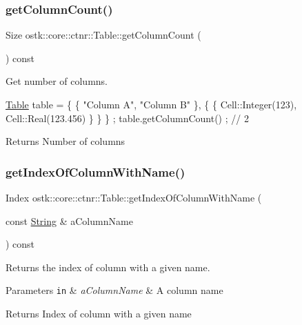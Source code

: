 \subsubsection{\texorpdfstring{get\+Column\+Count()}{getColumnCount()}}
{\footnotesize\ttfamily Size ostk\+::core\+::ctnr\+::\+Table\+::get\+Column\+Count (\begin{DoxyParamCaption}{ }\end{DoxyParamCaption}) const}



Get number of columns. 


\begin{DoxyCode}
\hyperlink{classostk_1_1core_1_1ctnr_1_1_table_a1b799fa804faf23f9dd4905df90a5cd7}{Table} table = \{ \{ \textcolor{stringliteral}{"Column A"}, \textcolor{stringliteral}{"Column B"} \}, \{ \{ Cell::Integer(123), Cell::Real(123.456) \} \} \} ;
table.getColumnCount() ; \textcolor{comment}{// 2}
\end{DoxyCode}


\begin{DoxyReturn}{Returns}
Number of columns 
\end{DoxyReturn}
\mbox{\label{classostk_1_1core_1_1ctnr_1_1_table_aa778da3685c788f96eeddc7eb870581a}} 
\subsubsection{\texorpdfstring{get\+Index\+Of\+Column\+With\+Name()}{getIndexOfColumnWithName()}}
{\footnotesize\ttfamily Index ostk\+::core\+::ctnr\+::\+Table\+::get\+Index\+Of\+Column\+With\+Name (\begin{DoxyParamCaption}\item[{const \hyperlink{classostk_1_1core_1_1types_1_1_string}{String} \&}]{a\+Column\+Name }\end{DoxyParamCaption}) const}



Returns the index of column with a given name. 


\begin{DoxyParams}[1]{Parameters}
\mbox{\tt in}  & {\em a\+Column\+Name} & A column name \\
\hline
\end{DoxyParams}
\begin{DoxyReturn}{Returns}
Index of column with a given name 
\end{DoxyReturn}
\mbox{\label{classostk_1_1core_1_1ctnr_1_1_table_abe8c76eb8d3efed7c548b2112c3ba228}} 
